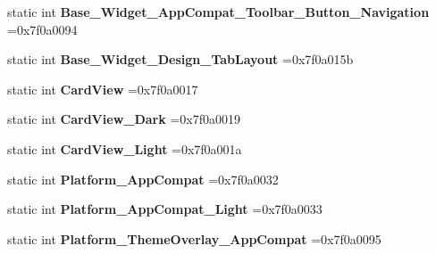 \begin{DoxyCompactItemize}
\mbox{\label{classandroid_1_1support_1_1v7_1_1cardview_1_1R_1_1style_afb92e21a627acfe4a94ea88018a442cd}} 
static int {\bfseries Base\+\_\+\+Widget\+\_\+\+App\+Compat\+\_\+\+Toolbar\+\_\+\+Button\+\_\+\+Navigation} =0x7f0a0094
\item 
\mbox{\label{classandroid_1_1support_1_1v7_1_1cardview_1_1R_1_1style_a9f9ff44b020a5932eb06da134774b377}} 
static int {\bfseries Base\+\_\+\+Widget\+\_\+\+Design\+\_\+\+Tab\+Layout} =0x7f0a015b
\item 
\mbox{\label{classandroid_1_1support_1_1v7_1_1cardview_1_1R_1_1style_a05681771357dc2df24f9679bc7da53d9}} 
static int {\bfseries Card\+View} =0x7f0a0017
\item 
\mbox{\label{classandroid_1_1support_1_1v7_1_1cardview_1_1R_1_1style_a70fd315420310be801740281708906f8}} 
static int {\bfseries Card\+View\+\_\+\+Dark} =0x7f0a0019
\item 
\mbox{\label{classandroid_1_1support_1_1v7_1_1cardview_1_1R_1_1style_ab22cd1d5236a64ac44a404498158e6cd}} 
static int {\bfseries Card\+View\+\_\+\+Light} =0x7f0a001a
\item 
\mbox{\label{classandroid_1_1support_1_1v7_1_1cardview_1_1R_1_1style_a958451bd6939f7cc84a2685d073871db}} 
static int {\bfseries Platform\+\_\+\+App\+Compat} =0x7f0a0032
\item 
\mbox{\label{classandroid_1_1support_1_1v7_1_1cardview_1_1R_1_1style_a7ba6d7196b73b55bd49556f0fa63410c}} 
static int {\bfseries Platform\+\_\+\+App\+Compat\+\_\+\+Light} =0x7f0a0033
\item 
\mbox{\label{classandroid_1_1support_1_1v7_1_1cardview_1_1R_1_1style_a9ab633d2c2fc64ce7f533567b2428f2f}} 
static int {\bfseries Platform\+\_\+\+Theme\+Overlay\+\_\+\+App\+Compat} =0x7f0a0095
\item 

\end{DoxyCompactItemize}
